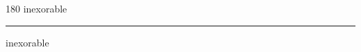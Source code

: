 
\begin{frame}
\begin{center}
\begin{turn}{180}
{\fontsize{2.5cm}{1em}\selectfont inexorable}
\end{turn}
\vspace{1em}\par  
\hrule
\vspace{1em}\par  
{\fontsize{2.5cm}{1em}\selectfont inexorable}
\end{center}
\end{frame}
